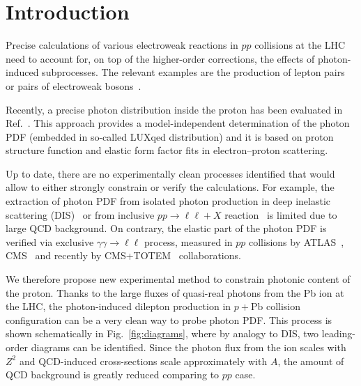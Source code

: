 \section{Introduction}

Precise calculations of various electroweak reactions in $pp$ collisions at the LHC need to account for, on top of the higher-order corrections, the effects of photon-induced subprocesses.
The relevant examples are the production of lepton pairs~\cite{Aad:2014qja, Aad:2016zzw,Accomando:2016tah, Luszczak:2015aoa, Harland-Lang:2016apc} or pairs of electroweak bosons~\cite{Luszczak:2014mta, Denner:2015fca, Dyndal:2015hrp, Ababekri:2016kkj, Biedermann:2016guo, Biedermann:2016yvs, Yong:2016njr, Luszczak:2018ntp}.


Recently, a precise photon distribution inside the proton has been evaluated in Ref.~\cite{Manohar:2016nzj}.
This approach provides a model-independent determination of the photon PDF (embedded in so-called LUXqed distribution)
and  it is based on proton structure function and elastic form factor fits in electron--proton scattering.

Up to date, there are no experimentally clean processes identified that would allow to either strongly constrain or verify the calculations.
For example, the extraction of photon PDF from isolated photon production in deep inelastic scattering (DIS)~\cite{Schmidt:2015zda} 
or from inclusive $pp\rightarrow\ell\ell+X$ reaction~\cite{Ball:2013hta, Aad:2016zzw, Giuli:2017oii} is limited due to large QCD background.
On contrary, the elastic part of the photon PDF is verified via exclusive $\gamma\gamma\rightarrow\ell\ell$ process, measured in $pp$ collisions by ATLAS~\cite{Aad:2015bwa,Aaboud:2017oiq}, CMS~\cite{Chatrchyan:2011ci,Chatrchyan:2012tv} and recently by CMS+TOTEM~\cite{Cms:2018het} collaborations.




We therefore propose new experimental method to constrain photonic content of the proton.
Thanks to the large fluxes of quasi-real photons from the Pb ion at the LHC, the photon-induced dilepton production in $p+\textrm{Pb}$ collision configuration can be a very clean way to probe photon PDF.
This process is shown schematically in Fig.~\ref{fig:diagrams}, where by analogy to DIS, two leading-order diagrams can be identified.
Since the photon flux from the ion scales with $Z^2$ and QCD-induced cross-sections scale approximately with $A$,
the amount of QCD background is greatly reduced comparing to $pp$ case.

